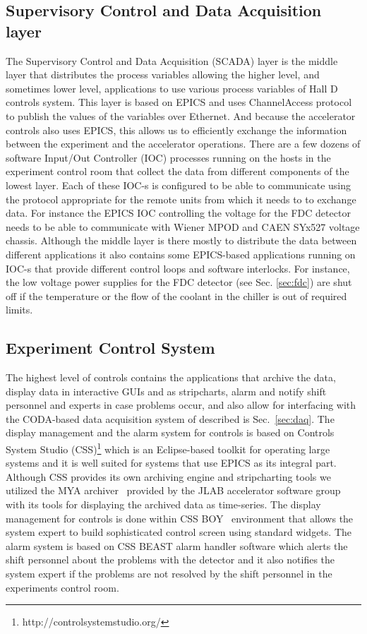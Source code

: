 \subsection{Supervisory Control and Data Acquisition layer \label{sec:archiver}}
The Supervisory Control and Data Acquisition (SCADA) layer is the middle layer that distributes the process variables allowing the higher level, and sometimes lower level, applications to use various process variables of Hall D controls system. This layer is based on EPICS and uses ChannelAccess protocol to publish the values of the variables over Ethernet. And because the accelerator controls also uses EPICS, this allows us to efficiently exchange the information between the experiment and the accelerator operations. There are a few dozens of software Input/Out Controller (IOC) processes running on the hosts in the experiment control room that collect the data from different components of the lowest layer. Each of these IOC-s is configured to be able to communicate using the protocol appropriate for the remote units from which it needs to to exchange data. For instance the EPICS IOC controlling the voltage for the FDC detector needs to be able to communicate with Wiener MPOD and CAEN SYx527 voltage chassis. Although the middle layer is there mostly to distribute the data between different applications it also contains some EPICS-based applications running on IOC-s that provide different control loops and software interlocks.  For instance, the low voltage power supplies for the FDC detector (see Sec. \ref{sec:fdc}) are shut off if the temperature or the flow of the coolant in the chiller is out of required limits. 
\subsection{Experiment Control System \label{sec:alarms}}
The highest level of controls contains the applications that archive the data, display data in interactive GUIs and as stripcharts, alarm and notify shift personnel and experts in case problems occur, and also allow for interfacing with the CODA-based data acquisition system of \gx{} described is Sec.~\ref{sec:daq}.
The display management and the alarm system for \gx{} controls is based on Controls System Studio (CSS)\footnote{http://controlsystemstudio.org/}  which is an Eclipse-based toolkit for operating large systems and it is well suited for systems that use EPICS as its integral part. Although CSS provides its own archiving engine and stripcharting tools we utilized the MYA archiver~\cite{Slominski:2009icaleps} provided by the JLAB accelerator software group with its tools for displaying the archived data as time-series. The display management for \gx{} controls is done within CSS BOY~\cite{Chen:2011icaleps} environment that allows the system expert to build sophisticated control screen using standard widgets. The alarm system is based on CSS BEAST\cite{Kasemir:2009icaleps} alarm handler software which alerts the shift personnel about the problems with the detector and it also notifies the system expert if the problems are not resolved by the shift personnel in the experiments control room. 
